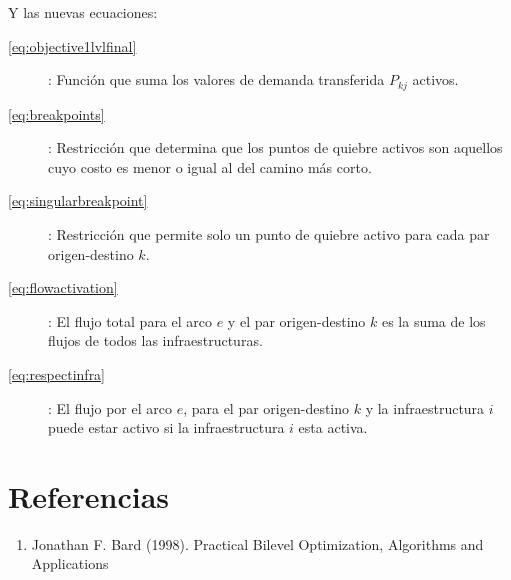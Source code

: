 \documentclass{article}
\begin{document}
  Y las nuevas ecuaciones:

  \begin{description}
    \item[\ref{eq:objective1lvlfinal}]: Función que suma los valores de demanda transferida $P_{kj}$ activos.
    \item[\ref{eq:breakpoints}]: Restricción que determina que los puntos de quiebre activos son aquellos cuyo costo es menor o igual al del camino más corto.
    \item[\ref{eq:singularbreakpoint}]: Restricción que permite solo un punto de quiebre activo para cada par origen-destino $k$.
    \item[\ref{eq:flowactivation}]: El flujo total para el arco $e$ y el par origen-destino $k$ es la suma de los flujos de todos las infraestructuras.
    \item[\ref{eq:respectinfra}]: El flujo por el arco $e$, para el par origen-destino $k$ y la infraestructura $i$ puede estar activo si la infraestructura $i$ esta activa.  
  \end{description}

  \section*{Referencias}

  \begin{enumerate}
    \item{\label{bardbook} Jonathan F. Bard (1998). Practical Bilevel Optimization, Algorithms and Applications}
  \end{enumerate}
\end{document}
